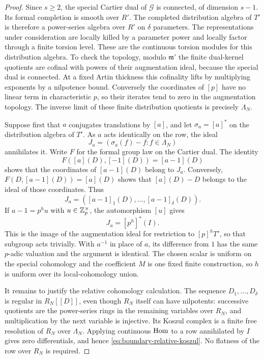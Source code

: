 \begin{proof}
Since $s\geq2$, the special Cartier dual of $\mathcal G$ is
connected, of dimension $s-1$.  Its formal completion is smooth over
$R'$.  The completed distribution algebra of $T'$ is therefore a
power-series algebra over $R'$ on $\delta$ parameters.  The
representations under consideration are locally killed by a
parameter power and locally factor through a finite torsion level.
These are the continuous torsion modules for this distribution
algebra.  To check the topology, modulo $\mathfrak m'$ the finite
dual-kernel quotients are cofinal with powers of their augmentation
ideal, because the special dual is connected.  At a fixed Artin
thickness this cofinality lifts by multiplying exponents by a
nilpotence bound.  Conversely the coordinates of $[p]$ have no
linear term in characteristic $p$, so their iterates tend to zero
in the augmentation topology.  The inverse limit of these finite
distribution quotients is precisely $\Lambda_N$.

Suppose first that $a$ conjugates translations by $[a]$, and let
$\sigma_a=[a]^*$ on the distribution algebra of $T'$.  As $a$ acts
identically on the row, the ideal
\[
 J_a=(\sigma_a(f)-f:f\in\Lambda_N)
\]
annihilates it.  Write $F$ for the formal group law on the Cartier
dual.  The identity
\[
 F([a](D),[-1](D))=[a-1](D)
\]
shows that the coordinates of $[a-1](D)$ belong to $J_a$.
Conversely, $F(D,[a-1](D))=[a](D)$ shows that
$[a](D)-D$ belongs to the ideal of those coordinates.  Thus
\[
 J_a=([a-1]_1(D),\ldots,[a-1]_\delta(D)).
\]
If $a-1=p^hu$ with $u\in\mathbb Z_p^\times$, the automorphism $[u]$ gives
\[
 J_a=[p^h]^*(I).
\]
This is the image of the augmentation ideal for restriction to
$[p]^hT'$, so that subgroup acts trivially.  With $a^{-1}$ in place
of $a$, its difference from $1$ has the same $p$-adic valuation and
the argument is identical.  The chosen scalar is uniform on the
special cohomology and the coefficient $M$ is one fixed finite
construction, so $h$ is uniform over its local-cohomology union.

It remains to justify the relative cohomology calculation.  The
sequence $D_1,\ldots,D_\delta$ is regular in $R_N[[D]]$, even though
$R_N$ itself can have nilpotents: successive quotients are the
power-series rings in the remaining variables over $R_N$, and
multiplication by the next variable is injective.  Its Koszul
complex is a finite free resolution of $R_N$ over $\Lambda_N$.
Applying continuous $\operatorname{Hom}$ to a row annihilated by $I$ gives zero
differentials, and hence \eqref{eq:boundary-relative-koszul}.  No
flatness of the row over $R_N$ is required.


\end{proof}
